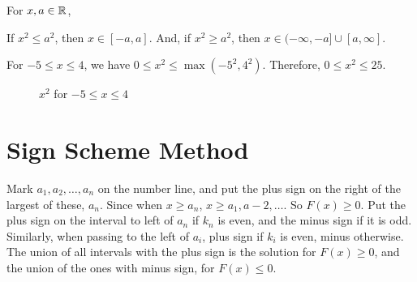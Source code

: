 \begin{proposition}
    For \(x, a \in \mathbb R\),
    \begin{itemize}
        \ii If \(x^2 \le a^2\), then \(x \in [-a,a]\).
        \ii And, if \(x^2 \ge a^2\), then \(x \in (-\infty,-a] \cup [a, \infty]\).   
    \end{itemize}
    \end{proposition}


\begin{example}
    For \(-5 \le x \le 4\), we have \( 0 \le x^2 \le \max(-5^2, 4^2)\). Therefore, \(0 \le 
    x^2 \le 25\).
\begin{figure}[H]
    \centering
    \caption{ {\color{red}\(x^2\)} for \(-5 \le x \le 4\)}
\end{figure}
\end{example}

\section{Sign Scheme Method}



\begin{enumerate}
    \ii Mark \(a_1,a_2,\dots,a_n\) on the number line, and put the plus sign on the right of the
    largest of these, \(a_n\). Since when \(x \ge a_n\), \(x \ge a_1, a-2, \dots\). So \(F(x) \ge 0\).
    \ii Put the plus sign on the interval to left of \(a_n\) if \(k_n\) is even, and the minus 
    sign if it is odd. Similarly, when passing to the left of \(a_i\), plus sign if \(k_i\)
    is even, minus otherwise.
    \ii The union of all intervals with the plus sign is the solution for \(F(x) \ge 0\), and
    the union of the ones with minus sign, for \(F(x) \le 0\). 
\end{enumerate}


